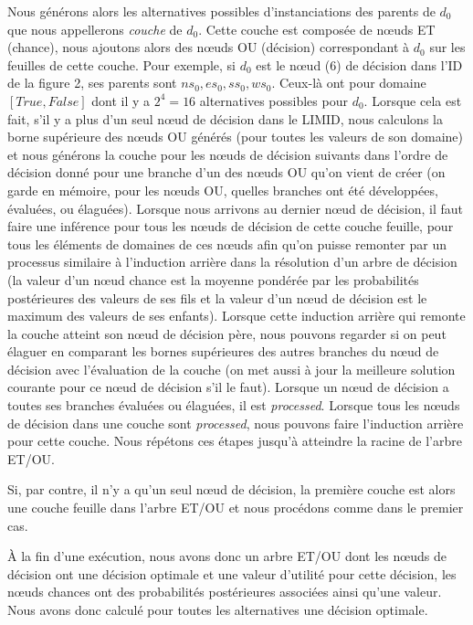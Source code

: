 \documentclass[12pt]{article}
\begin{document}
Nous générons alors les alternatives possibles d'instanciations des parents de $d_0$ que nous appellerons \textit{couche} de $d_0$. Cette couche est composée de nœuds ET (chance), nous ajoutons alors des nœuds OU (décision) correspondant à $d_0$ sur les feuilles de cette couche. Pour exemple, si $d_0$ est le nœud (6) de décision dans l'ID de la figure 2, ses parents sont $ns_0, es_0, ss_0, ws_0$. Ceux-là ont pour domaine $[True, False]$  dont il y a $2^4=16$ alternatives possibles pour $d_0$.
Lorsque cela est fait, s'il y a plus d'un seul nœud de décision dans le LIMID, nous calculons la borne supérieure des nœuds OU générés (pour toutes les valeurs de son domaine) et nous générons la couche pour les nœuds de décision suivants dans l'ordre de décision donné pour une branche d'un des nœuds OU qu'on vient de créer (on garde en mémoire, pour les nœuds OU, quelles branches ont été développées, évaluées, ou élaguées). Lorsque nous arrivons au dernier nœud de décision, il faut faire une inférence pour tous les nœuds de décision de cette couche feuille, pour tous les éléments de domaines de ces nœuds afin qu'on puisse remonter par un processus similaire à l'induction arrière dans la résolution d'un arbre de décision (la valeur d'un nœud chance est la moyenne pondérée par les probabilités postérieures des valeurs de ses fils et la valeur d'un nœud de décision est le maximum des valeurs de ses enfants). Lorsque cette induction arrière qui remonte la couche atteint son nœud de décision père, nous pouvons regarder si on peut élaguer en comparant les bornes supérieures des autres branches du nœud de décision avec l'évaluation de la couche (on met aussi à jour la meilleure solution courante pour ce nœud de décision s'il le faut). Lorsque un nœud de décision a toutes ses branches évaluées ou élaguées, il est \textit{processed}. Lorsque tous les nœuds de décision dans une couche sont \textit{processed}, nous pouvons faire l'induction arrière pour cette couche. Nous répétons ces étapes jusqu'à atteindre la racine de l'arbre ET/OU. 

Si, par contre, il n'y a qu'un seul nœud de décision, la première couche est alors une couche feuille dans l'arbre ET/OU et nous procédons comme dans le premier cas.

À la fin d'une exécution, nous avons donc un arbre ET/OU dont les nœuds de décision ont une décision optimale et une valeur d'utilité pour cette décision, les nœuds chances ont des probabilités postérieures associées ainsi qu'une valeur. Nous avons donc calculé pour toutes les alternatives une décision optimale.
\end{document}
